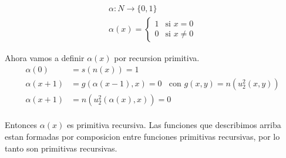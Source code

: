 \documentclass{report}
\begin{document}
\[
	\begin{aligned}
		\alpha:N\rightarrow\{0,1\} \\
		\alpha(x)=\begin{cases}
			          1 & \text{si } x=0    \\
			          0 & \text{si } x\neq0
		          \end{cases}
	\end{aligned}
\]

Ahora vamos a definir $\alpha(x)$ por recursion primitiva.\\

$$\begin{aligned}
		\alpha(0)   & =s(n(x))=1                                                      \\
		\alpha(x+1) & =g(\alpha(x-1),x)=0 \ \ \ \ \text{con\ } g(x,y) = n(u_2^2(x,y)) \\
		\alpha(x+1) & =n(u_{2}^{2}(\alpha(x),x))=0
	\end{aligned}$$\\

Entonces $\alpha(x)$ es primitiva recursiva.
Las funciones que describimos arriba estan formadas por composicion entre funciones primitivas recursivas, por lo tanto son primitivas recursivas.\\
\end{document}

